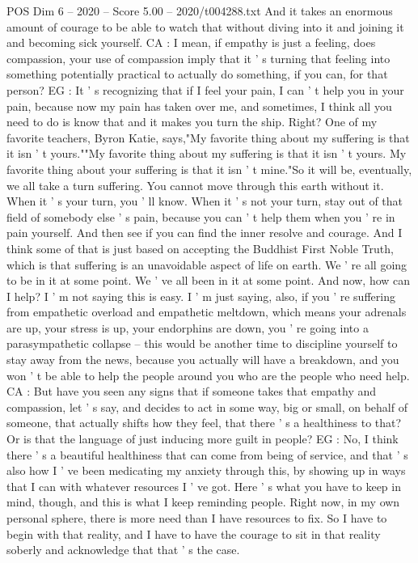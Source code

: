 \begin{textsample}{POS Dim 6 – 2020 – Score 5.00 – 2020/t004288.txt}
And it takes an enormous amount of courage to be able to watch that without diving into it and joining it and becoming sick yourself.
CA : I mean, if empathy is just a feeling, does compassion, your use of compassion imply that it ' s turning that feeling into something potentially practical to actually do something, if you can, for that person?
EG : It ' s recognizing that if I feel your pain, I can ' t help you in your pain, because now my pain has taken over me, and sometimes, I think all you need to do is know that and it makes you turn the ship.
Right?
One of my favorite teachers, Byron Katie, says,"My favorite thing about my suffering is that it isn ' t yours.""My favorite thing about my suffering is that it isn ' t yours.
My favorite thing about your suffering is that it isn ' t mine."So it will be, eventually, we all take a turn suffering.
You cannot move through this earth without it.
When it ' s your turn, you ' ll know.
When it ' s not your turn, stay out of that field of somebody else ' s pain, because you can ' t help them when you ' re in pain yourself.
And then see if you can find the inner resolve and courage.
And I think some of that is just based on accepting the Buddhist First Noble Truth, which is that suffering is an unavoidable aspect of life on earth.
We ' re all going to be in it at some point.
We ' ve all been in it at some point.
And now, how can I help?
I ' m not saying this is easy.
I ' m just saying, also, if you ' re suffering from empathetic overload and empathetic meltdown, which means your adrenals are up, your stress is up, your endorphins are down, you ' re going into a parasympathetic collapse -- this would be another time to discipline yourself to stay away from the news, because you actually will have a breakdown, and you won ' t be able to help the people around you who are the people who need help.
CA : But have you seen any signs that if someone takes that empathy and compassion, let ' s say, and decides to act in some way, big or small, on behalf of someone, that actually shifts how they feel, that there ' s a healthiness to that?
Or is that the language of just inducing more guilt in people?
EG : No, I think there ' s a beautiful healthiness that can come from being of service, and that ' s also how I ' ve been medicating my anxiety through this, by showing up in ways that I can with whatever resources I ' ve got.
Here ' s what you have to keep in mind, though, and this is what I keep reminding people.
Right now, in my own personal sphere, there is more need than I have resources to fix.
So I have to begin with that reality, and I have to have the courage to sit in that reality soberly and acknowledge that that ' s the case.

\end{textsample}
